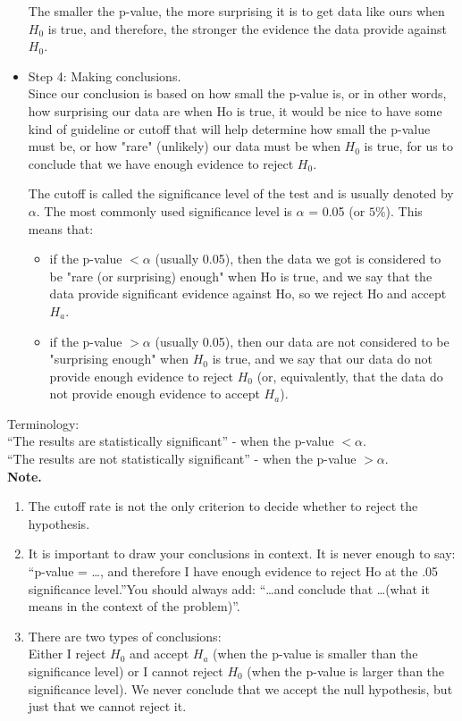 \documentclass[10pt, a4paper]{article}
\begin{document}
\begin{itemize}
The smaller the p-value, the more surprising it is to get data like ours when $H_0$ is true, and therefore, the stronger the evidence the data provide against $H_0$.
\item Step 4: Making conclusions.\\
Since our conclusion is based on how small the p-value is, or in other words, how surprising our data are when Ho is true, it would be nice to have some kind of guideline or cutoff that will help determine how small the p-value must be, or how "rare" (unlikely) our data must be when $H_0$ is true, for us to conclude that we have enough evidence to reject $H_0$.\par
The cutoff is called the significance level of the test and is usually denoted by $\alpha$. The most commonly used significance level is $\alpha$ = 0.05 (or $5\%$). This means that:
\begin{itemize}
\item if the p-value $<\alpha$ (usually 0.05), then the data we got is considered to be "rare (or surprising) enough" when Ho is true, and we say that the data provide significant evidence against Ho, so we reject Ho and accept $H_a$.
\item if the p-value $>\alpha$ (usually 0.05), then our data are not considered to be "surprising enough" when $H_0$ is true, and we say that our data do not provide enough evidence to reject $H_0$ (or, equivalently, that the data do not provide enough evidence to accept $H_a$).
\end{itemize}
\end{itemize}
Terminology:\\
``The results are statistically significant'' - when the p-value  $<\alpha$.\\
``The results are not statistically significant'' - when the p-value  $>\alpha$.\\
\textbf{Note.}\\
\begin{enumerate}
\item The cutoff rate is not the only criterion to decide whether to reject the hypothesis.
\item It is important to draw your conclusions in context. It is never enough to say: ``p-value = \dots, and therefore I have enough evidence to reject Ho at the .05 significance level.''You should always add: ``\dots and conclude that \dots (what it means in the context of the problem)''.
\item There are two types of conclusions:\\
Either I reject $H_0$ and accept $H_a$ (when the p-value is smaller than the significance level) or I cannot reject $H_0$ (when the p-value is larger than the significance level). We never
conclude that we accept the null hypothesis, but just that we cannot
reject it. 
\end{enumerate}
\end{document}
